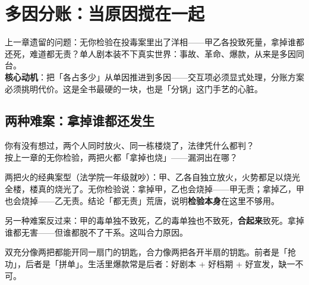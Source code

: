 \documentclass[../../main2.tex]{subfiles}
\begin{document}
\chapter{多因分账：当原因搅在一起}
\label{ch:multiple}

\begin{motivation}
	上一章遗留的问题：无你检验在投毒案里出了洋相——甲乙各投致死量，拿掉谁都还死，难道都无责？单人剧本装不下真实世界：事故、革命、爆款，从来是多因同台。\\
	\textbf{核心动机}：把「各占多少」从单因推进到多因——交互项必须显式处理，分账方案必须挑明代价。这是全书最硬的一块，也是「分锅」这门手艺的心脏。
\end{motivation}

\begin{logicmap}
\end{logicmap}

\section{两种难案：拿掉谁都还发生}

\begin{readingnote}
	你有没有想过，两个人同时放火、同一栋楼烧了，法律凭什么都判？\\
	按上一章的无你检验，两把火都「拿掉也烧」——漏洞出在哪？
\end{readingnote}

两把火的经典案型（法学院一年级就吵）：甲、乙各自独立放火，火势都足以烧光全楼，楼真的烧光了。无你检验说：拿掉甲，乙也会烧掉——甲无责；拿掉乙，甲也会烧掉——乙无责。结论「都无责」荒唐，说明\textbf{检验本身}在这里不够用。

另一种难案反过来：甲的毒单独不致死，乙的毒单独也不致死，\textbf{合起来}致死。拿掉谁都无害——但谁都脱不了干系。这叫合力原因。

\begin{tcolorbox}[colback=green!5, title=\textit{生活类比}]
	双充分像两把都能开同一扇门的钥匙，合力像两把各开半扇的钥匙。前者是「抢功」，后者是「拼单」。生活里爆款常是后者：好剧本 + 好档期 + 好宣发，缺一不可。
\end{tcolorbox}
\end{document}
